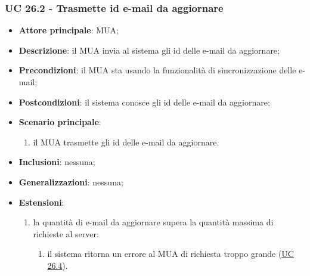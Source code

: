     \subsubsection{UC 26.2 - Trasmette id e-mail da aggiornare} \label{sec:UC26.2}
    \begin{itemize}
        \item \textbf{Attore principale}: MUA;
        \item \textbf{Descrizione}: il MUA invia al sistema gli id delle e-mail da aggiornare;
        \item \textbf{Precondizioni}: il MUA sta usando la funzionalità di sincronizzazione delle e-mail;
        \item \textbf{Postcondizioni}: il sistema conosce gli id delle e-mail da aggiornare;
        \item \textbf{Scenario principale}:
            \begin{enumerate}
                \item il MUA trasmette gli id delle e-mail da aggiornare.
            \end{enumerate}
        \item \textbf{Inclusioni}: nessuna;
        \item \textbf{Generalizzazioni}: nessuna;
        \item \textbf{Estensioni}:
            \begin{enumerate}[label=\alph*.]
                \item la quantità di e-mail da aggiornare supera la quantità massima di richieste al server:
                \begin{enumerate}[label=\arabic*.]
                    \item il sistema ritorna un errore al MUA di richiesta troppo grande (\hyperref[sec:UC26.4]{UC 26.4}).
                \end{enumerate}
            \end{enumerate}
    \end{itemize}


